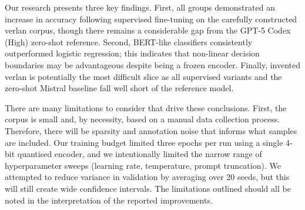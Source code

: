\documentclass[12pt]{article}
\begin{document}
Our research presents three key findings. First, all groups demonstrated an increase in accuracy following supervised fine-tuning on the carefully constructed verlan corpus, though there remains a considerable gap from the GPT-5 Codex (High) zero-shot reference. Second, BERT-like classifiers consistently outperformed logistic regression; this indicates that non-linear decision boundaries may be advantageous despite being a frozen encoder. Finally, invented verlan is potentially the most difficult slice as all supervised variants and the zero-shot Mistral baseline fall well short of the reference model.

There are many limitations to consider that drive these conclusions. First, the corpus is small and, by necessity, based on a manual data collection process. Therefore, there will be sparsity and annotation noise that informs what samples are included. Our training budget limited three epochs per run using a single 4-bit quantised encoder, and we intentionally limited the narrow range of hyperparameter sweeps (learning rate, temperature, prompt truncation). We attempted to reduce variance in validation by averaging over 20 seeds, but this will still create wide confidence intervals. The limitations outlined should all be noted in the interpretation of the reported improvements.
\end{document}

